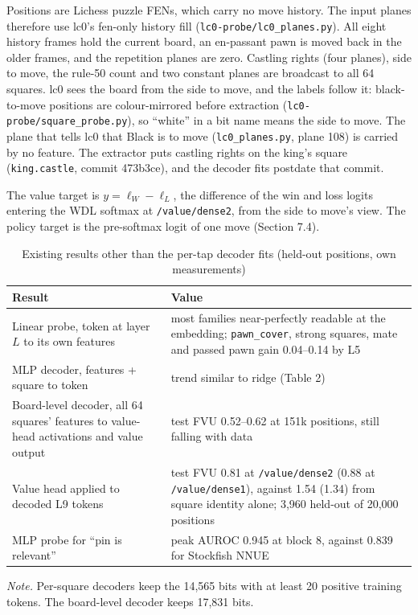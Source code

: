 \documentclass[conference]{IEEEtran}
\begin{document}
Positions are Lichess puzzle FENs, which carry no move history. The input planes therefore use lc0's fen-only history fill (\texttt{lc0-\allowbreak{}probe/\allowbreak{}lc0\_\allowbreak{}planes.\allowbreak{}py}). All eight history frames hold the current board, an en-passant pawn is moved back in the older frames, and the repetition planes are zero. Castling rights (four planes), side to move, the rule-50 count and two constant planes are broadcast to all 64 squares. lc0 sees the board from the side to move, and the labels follow it: black-to-move positions are colour-mirrored before extraction (\texttt{lc0-\allowbreak{}probe/\allowbreak{}square\_\allowbreak{}probe.\allowbreak{}py}), so ``white'' in a bit name means the side to move. The plane that tells lc0 that Black is to move (\texttt{lc0\_\allowbreak{}planes.\allowbreak{}py}, plane 108) is carried by no feature. The extractor puts castling rights on the king's square (\texttt{king.\allowbreak{}castle}, commit 473b3ce), and the decoder fits postdate that commit.

The value target is $y=\ell_W-\ell_L$, the difference of the win and loss logits entering the WDL softmax at \texttt{/\allowbreak{}value/\allowbreak{}dense2}, from the side to move's view. The policy target is the pre-softmax logit of one move (Section 7.4).

\begin{table}[!t]
\centering
\renewcommand{\thetable}{1}
\caption{Existing results other than the per-tap decoder fits (held-out positions, own measurements)}
\label{tab:1}
\footnotesize
\begin{tabularx}{\textwidth}{>{\raggedright\arraybackslash}p{4.6cm}>{\raggedright\arraybackslash}X}
\toprule
Result & Value \\
\midrule
Linear probe, token at layer $L$ to its own features & most families near-perfectly readable at the embedding; \texttt{pawn\_\allowbreak{}cover}, strong squares, mate and passed pawn gain 0.04--0.14 by L5 \\
MLP decoder, features + square to token & trend similar to ridge (Table 2) \\
Board-level decoder, all 64 squares' features to value-head activations and value output & test FVU 0.52--0.62 at 151k positions, still falling with data \\
Value head applied to decoded L9 tokens & test FVU 0.81 at \texttt{/\allowbreak{}value/\allowbreak{}dense2} (0.88 at \texttt{/\allowbreak{}value/\allowbreak{}dense1}), against 1.54 (1.34) from square identity alone; 3,960 held-out of 20,000 positions \\
MLP probe for ``pin is relevant'' & peak AUROC 0.945 at block 8, against 0.839 for Stockfish NNUE \\
\bottomrule
\end{tabularx}
\par\smallskip
\parbox{\textwidth}{\footnotesize \emph{Note.} Per-square decoders keep the 14,565 bits with at least 20 positive training tokens. The board-level decoder keeps 17,831 bits.}
\end{table}
\end{document}
